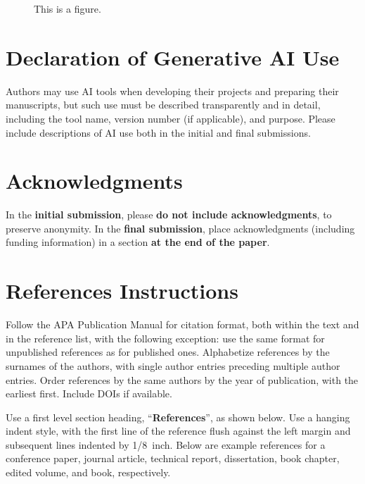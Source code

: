 \documentclass[10pt,letterpaper]{article}
\begin{document}
\begin{figure}[H]
  \begin{center}
  \end{center}
  \caption{This is a figure.}
  \label{sample-figure}
\end{figure}

\section{Declaration of Generative AI Use}

Authors may use AI tools when developing their projects and preparing their manuscripts, but such
use must be described transparently and in detail, including the tool name, version number (if
applicable), and purpose. Please include descriptions of AI use both in the initial and final
submissions.

\section{Acknowledgments}

In the \textbf{initial submission}, please \textbf{do not include acknowledgments}, to preserve
anonymity. In the \textbf{final submission}, place acknowledgments (including funding information)
in a section \textbf{at the end of the paper}.

\section{References Instructions}

Follow the APA Publication Manual for citation format, both within the text and in the reference
list, with the following exception: use the same format for unpublished references as for published
ones. Alphabetize references by the surnames of the authors, with single author entries preceding
multiple author entries. Order references by the same authors by the year of publication, with the
earliest first. Include DOIs if available.

Use a first level section heading, ``\textbf{References}'', as shown below. Use a hanging indent
style, with the first line of the reference flush against the left margin and subsequent lines
indented by 1/8~inch. Below are example references for a conference paper, journal article,
technical report, dissertation, book chapter, edited volume, and book, respectively.

\nocite{August2007}
\nocite{DaphneEcho2022}
\nocite{FitzgeraldGalli1985}
\nocite{Hakuole2001}
\nocite{Issa1963}
\nocite{Lobsang2023}
\nocite{MitanniNovember1972}

\printbibliography
\end{document}
